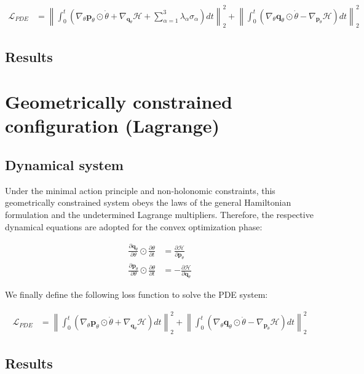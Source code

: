 \documentclass[draft]{agujournal2019}
\newcommand{\norm}[1]{\left\lVert#1\right\rVert}
\begin{document}
\begin{align}
    \mathcal{L}_{PDE} &= \norm{\int_0^t \left(\nabla_\theta \mathbf{p}_\theta \odot \dot{\theta} + \nabla_{\mathbf{q}_\theta} \mathcal{H} + \sum_{\alpha = 1}^3 \lambda_\alpha \sigma_\alpha \right) dt}_2^2 + \norm{\int_0^t \left(\nabla_\theta \mathbf{q}_\theta \odot \dot{\theta} - \nabla_{\mathbf{p}_\theta} \mathcal{H}\right) dt}^2_2
\end{align}

\subsection{Results}
\section{Geometrically constrained configuration (Lagrange)}
\subsection{Dynamical system}
Under the minimal action principle and non-holonomic constraints, this geometrically constrained system obeys the laws of the general Hamiltonian formulation and the undetermined Lagrange multipliers. Therefore, the respective dynamical equations are adopted for the convex optimization phase:

\begin{align}
    \frac{\partial \mathbf{q}_\theta}{\partial \theta} \odot \frac{\partial \theta}{\partial t} &= \frac{\partial \mathcal{H}}{\partial \mathbf{p}_\theta} \\
    \frac{\partial \mathbf{p}_\theta}{\partial \theta} \odot \frac{\partial \theta}{\partial t} &= - \frac{\partial \mathcal{H}}{\partial \mathbf{q}_\theta}
\end{align}

We finally define the following loss function to solve the PDE system:

\begin{align}
    \mathcal{L}_{PDE} &= \norm{\int_0^t \left(\nabla_\theta \mathbf{p}_\theta \odot \dot{\theta} + \nabla_{\mathbf{q}_\theta} \mathcal{H}\right) dt}_2^2 + \norm{\int_0^t \left(\nabla_\theta \mathbf{q}_\theta \odot \dot{\theta} - \nabla_{\mathbf{p}_\theta} \mathcal{H}\right) dt}^2_2
\end{align}
\subsection{Results}
\end{document}
